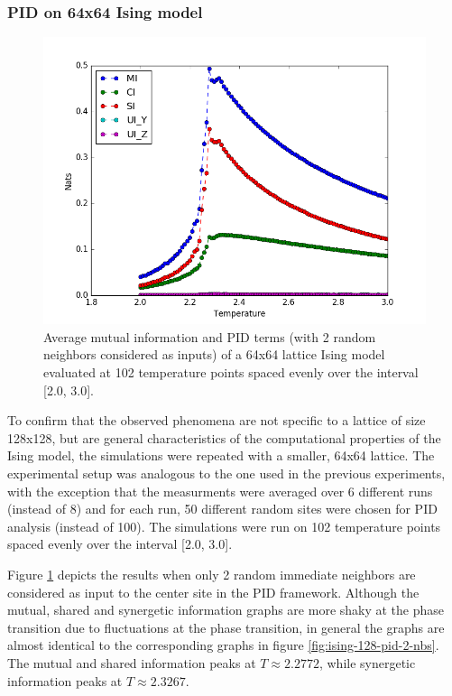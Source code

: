 \documentclass[12pt]{article}
\begin{document}
\subsubsection{PID on 64x64 Ising model}

\begin{figure} [h]
\begin{center}
\includegraphics[width=.9\textwidth]{ising-64-pid-2-nbs}
\caption{Average mutual information and PID terms (with 2 random neighbors considered as inputs) of a 64x64 lattice Ising model evaluated at 102 temperature points spaced evenly over the interval [2.0, 3.0].}
\label{fig:ising-64-pid-2-nbs}
\end{center}
\end{figure}

To confirm that the observed phenomena are not specific to a lattice of size 128x128, but are general characteristics of the computational properties of the Ising model, the simulations were repeated with a smaller, 64x64 lattice. The experimental setup was analogous to the one used in the previous experiments, with the exception that the measurments were averaged over 6 different runs (instead of 8) and for each run, 50 different random sites were chosen for PID analysis (instead of 100). The simulations were run on 102 temperature points spaced evenly over the interval [2.0, 3.0].

Figure \ref{fig:ising-64-pid-2-nbs} depicts the results when only 2 random immediate neighbors are considered as input to the center site in the PID framework. Although the mutual, shared and synergetic information graphs are more shaky at the phase transition due to fluctuations at the phase transition, in general the graphs are almost identical to the corresponding graphs in figure \ref{fig:ising-128-pid-2-nbs}. The mutual and shared information peaks at $T \approx 2.2772$, while synergetic information peaks at $T \approx 2.3267$.
\end{document}
